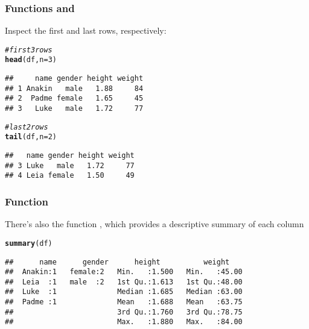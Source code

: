 \documentclass[12pt]{beamer}\usepackage[]{graphicx}\usepackage[]{color}
\makeatletter
\newcommand{\hlnum}[1]{\textcolor[rgb]{0.686,0.059,0.569}{#1}}%
\newcommand{\hlcom}[1]{\textcolor[rgb]{0.678,0.584,0.686}{\textit{#1}}}%
\newcommand{\hlstd}[1]{\textcolor[rgb]{0.345,0.345,0.345}{#1}}%
\newcommand{\hlkwc}[1]{\textcolor[rgb]{0.333,0.667,0.333}{#1}}%
\newcommand{\hlkwd}[1]{\textcolor[rgb]{0.737,0.353,0.396}{\textbf{#1}}}%
\newenvironment{kframe}{%
 \def\at@end@of@kframe{}%
 \ifinner\ifhmode%
  \def\at@end@of@kframe{\end{minipage}}%
  \begin{minipage}{\columnwidth}%
 \fi\fi%
 \def\FrameCommand##1{\hskip\@totalleftmargin \hskip-\fboxsep
 \colorbox{shadecolor}{##1}\hskip-\fboxsep
     \hskip-\linewidth \hskip-\@totalleftmargin \hskip\columnwidth}%
 \MakeFramed {\advance\hsize-\width
   \@totalleftmargin\z@ \linewidth\hsize
   \@setminipage}}%
 {\par\unskip\endMakeFramed%
 \at@end@of@kframe}
\newenvironment{knitrout}{}{} %
\makeatother
\begin{document}

\begin{frame}[fragile]
\frametitle{Functions  and }

Inspect the first and last rows, respectively:
\begin{knitrout}\footnotesize
{}\color{fgcolor}\begin{kframe}
\begin{alltt}
\hlcom{# first 3 rows}
\hlkwd{head}\hlstd{(df,} \hlkwc{n} \hlstd{=} \hlnum{3}\hlstd{)}
\end{alltt}
\begin{verbatim}
##     name gender height weight
## 1 Anakin   male   1.88     84
## 2  Padme female   1.65     45
## 3   Luke   male   1.72     77
\end{verbatim}
\begin{alltt}
\hlcom{# last 2 rows}
\hlkwd{tail}\hlstd{(df,} \hlkwc{n} \hlstd{=} \hlnum{2}\hlstd{)}
\end{alltt}
\begin{verbatim}
##   name gender height weight
## 3 Luke   male   1.72     77
## 4 Leia female   1.50     49
\end{verbatim}
\end{kframe}
\end{knitrout}

\end{frame}


\begin{frame}[fragile]
\frametitle{Function }

There's also the function , which provides a descriptive summary of each column
\begin{knitrout}\footnotesize
{}\color{fgcolor}\begin{kframe}
\begin{alltt}
\hlkwd{summary}\hlstd{(df)}
\end{alltt}
\begin{verbatim}
##      name      gender      height          weight     
##  Anakin:1   female:2   Min.   :1.500   Min.   :45.00  
##  Leia  :1   male  :2   1st Qu.:1.613   1st Qu.:48.00  
##  Luke  :1              Median :1.685   Median :63.00  
##  Padme :1              Mean   :1.688   Mean   :63.75  
##                        3rd Qu.:1.760   3rd Qu.:78.75  
##                        Max.   :1.880   Max.   :84.00
\end{verbatim}
\end{kframe}
\end{knitrout}

\end{frame}
\end{document}
